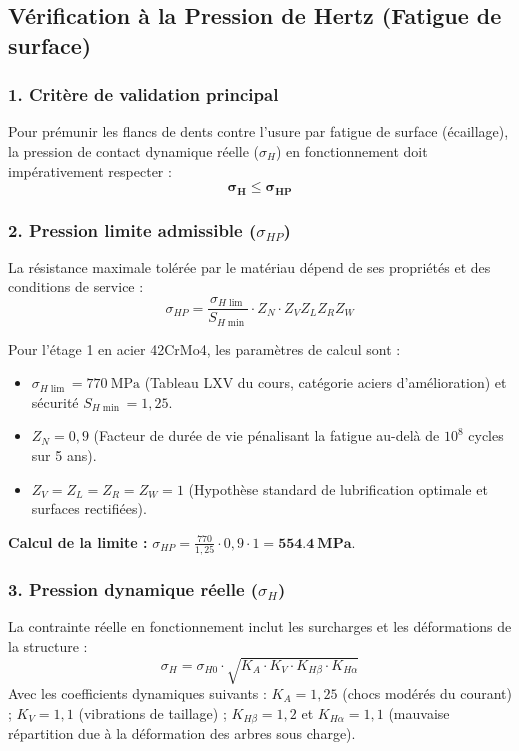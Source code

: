 \documentclass[11pt,a4paper]{article}
\begin{document}
\subsection{Vérification à la Pression de Hertz (Fatigue de surface)}

\subsubsection*{1. Critère de validation principal}

Pour prémunir les flancs de dents contre l'usure par fatigue de surface (écaillage), la pression de contact dynamique réelle ($\sigma_H$) en fonctionnement doit impérativement respecter :
\[ \mathbf{\sigma_H \le \sigma_{HP}} \]

\subsubsection*{2. Pression limite admissible ($\sigma_{HP}$)}

La résistance maximale tolérée par le matériau dépend de ses propriétés et des conditions de service :
\[ \sigma_{HP} = \frac{\sigma_{H \lim}}{S_{H \min}} \cdot Z_N \cdot Z_V Z_L Z_R Z_W \]

Pour l'étage 1 en acier 42CrMo4, les paramètres de calcul sont :
\begin{itemize}
    \item $\sigma_{H\lim} = \qty{770}{\mega\pascal}$ (Tableau LXV du cours, catégorie aciers d'amélioration) et sécurité $S_{H\min} = 1{,}25$.
    \item $Z_N = 0{,}9$ (Facteur de durée de vie pénalisant la fatigue au-delà de $10^8$ cycles sur 5 ans).
    \item $Z_V = Z_L = Z_R = Z_W = 1$ (Hypothèse standard de lubrification optimale et surfaces rectifiées).
\end{itemize}
\textbf{Calcul de la limite :} $\sigma_{HP} = \frac{770}{1{,}25} \cdot 0{,}9 \cdot 1 = \mathbf{\qty{554,4}{\mega\pascal}}$.

\subsubsection*{3. Pression dynamique réelle ($\sigma_H$)}

La contrainte réelle en fonctionnement inclut les surcharges et les déformations de la structure :
\[ \sigma_H = \sigma_{H0} \cdot \sqrt{K_A \cdot K_V \cdot K_{H\beta} \cdot K_{H\alpha}} \]
Avec les coefficients dynamiques suivants : $K_A = 1{,}25$ (chocs modérés du courant) ; $K_V = 1{,}1$ (vibrations de taillage) ; $K_{H\beta} = 1{,}2$ et $K_{H\alpha} = 1{,}1$ (mauvaise répartition due à la déformation des arbres sous charge).
\end{document}
